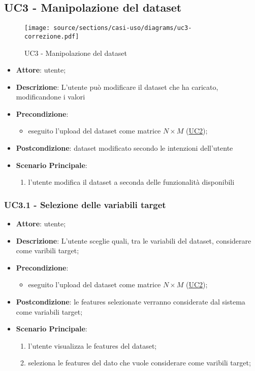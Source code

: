 \subsection{UC3 - Manipolazione del dataset}
\label{uc3}

\begin{figure}[htbp]
        \centering
        \texttt{[image: source/sections/casi-uso/diagrams/uc3-correzione.pdf]}
        \caption{UC3 - Manipolazione del dataset}
        \label{fig:uc3}
    \end{figure}
    
    
\begin{itemize}
    \item \textbf{Attore}: utente;
    \item \textbf{Descrizione}: L'utente può modificare il dataset che ha caricato, modificandone i valori 
    \item \textbf{Precondizione}:
    \begin{itemize}
        \item eseguito l'upload del dataset come matrice $N\times M$ (\hyperref[uc2]{UC2});
    \end{itemize}
    \item \textbf{Postcondizione}: dataset modificato secondo le intenzioni dell'utente
    \item \textbf{Scenario Principale}: 
    \begin{enumerate}
        \item l'utente modifica il dataset a seconda delle funzionalità disponibili
    \end{enumerate}  
    \end{itemize}


\subsubsection{UC3.1 - Selezione delle variabili target}
\label{uc3.1}


    \begin{itemize}
    \item \textbf{Attore}: utente;
    \item \textbf{Descrizione}: L'utente sceglie quali, tra le variabili del dataset, considerare come varibili target;
    \item \textbf{Precondizione}:
    \begin{itemize}
        \item eseguito l'upload del dataset come matrice $N\times M$ (\hyperref[uc2]{UC2});
    \end{itemize}
    \item \textbf{Postcondizione}: le features selezionate verranno considerate dal sistema come variabili target;
    \item \textbf{Scenario Principale}: 
    \begin{enumerate}
        \item l'utente visualizza le features del dataset;
        \item seleziona le features del dato che vuole considerare come varibili target;
    \end{enumerate}  
    \end{itemize}
    
